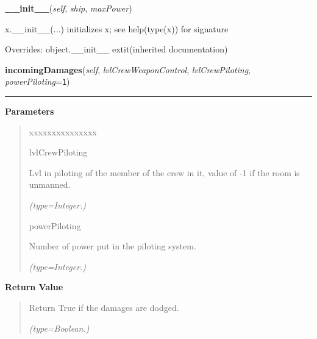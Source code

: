     \vspace{0.5ex}

\hspace{.8\funcindent}\begin{boxedminipage}{\funcwidth}

    \raggedright \textbf{\_\_init\_\_}(\textit{self}, \textit{ship}, \textit{maxPower})

\setlength{\parskip}{2ex}
    x.\_\_init\_\_(...) initializes x; see help(type(x)) for signature

\setlength{\parskip}{1ex}
      Overrides: object.\_\_init\_\_ 	extit{(inherited documentation)}

    \end{boxedminipage}

    \label{systems:Engines:incomingDamages}

    \vspace{0.5ex}

\hspace{.8\funcindent}\begin{boxedminipage}{\funcwidth}

    \raggedright \textbf{incomingDamages}(\textit{self}, \textit{lvlCrewWeaponControl}, \textit{lvlCrewPiloting}, \textit{powerPiloting}={\tt 1})

    \vspace{-1.5ex}

    \rule{\textwidth}{0.5\fboxrule}
\setlength{\parskip}{2ex}
\setlength{\parskip}{1ex}
      \textbf{Parameters}
      \vspace{-1ex}

      \begin{quote}
        \begin{Ventry}{xxxxxxxxxxxxxxx}

          \item[lvlCrewPiloting]

          Lvl in piloting of the member of the crew in it, value of -1 if 
          the room is unmanned.

            {\it (type=Integer.)}

          \item[powerPiloting]

          Number of power put in the piloting system.

            {\it (type=Integer.)}

        \end{Ventry}

      \end{quote}

      \textbf{Return Value}
    \vspace{-1ex}

      \begin{quote}
      Return True if the damages are dodged.

      {\it (type=Boolean.)}

      \end{quote}

    \end{boxedminipage}


